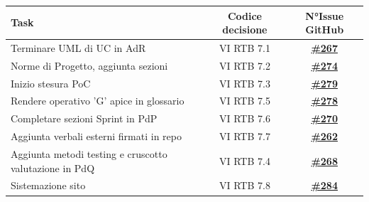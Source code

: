 \documentclass[a4paper,12pt]{article}
\newcommand{\ignoreglossary}{}
\begin{document}
\begin{center}
\small
\renewcommand{\arraystretch}{1.2} 
\begin{tabular}{|p{}|c|c|}
\hline
\rowcolor{gray!60} 
\textbf{Task} & \textbf{Codice decisione} & \textbf{N°Issue GitHub} \\
\hline
\rowcolor{white}
Terminare UML di UC in AdR & VI \ignoreglossary{RTB} 7.1 & \href{https://github.com/SWE-BitByBit/SWE-docs/issues/267}{\textbf{\#267}} \\
\hline
\rowcolor{gray!20}
Norme di Progetto, aggiunta sezioni & VI \ignoreglossary{RTB} 7.2 & \href{https://github.com/SWE-BitByBit/SWE-docs/issues/274}{\textbf{\#274}} \\
\hline
\rowcolor{white}
Inizio stesura PoC & VI \ignoreglossary{RTB} 7.3 & \href{https://github.com/SWE-BitByBit/SWE-docs/issues/279}{\textbf{\#279}} \\
\hline
\rowcolor{gray!20}
Rendere operativo 'G' apice in glossario & VI \ignoreglossary{RTB} 7.5 & \href{https://github.com/SWE-BitByBit/SWE-docs/issues/278}{\textbf{\#278}} \\
\hline
\rowcolor{white}
Completare sezioni Sprint in PdP & VI \ignoreglossary{RTB} 7.6 & \href{https://github.com/SWE-BitByBit/SWE-docs/issues/270}{\textbf{\#270}} \\
\hline
\rowcolor{gray!20}
Aggiunta verbali esterni firmati in repo & VI \ignoreglossary{RTB} 7.7 & \href{https://github.com/SWE-BitByBit/SWE-docs/issues/262}{\textbf{\#262}} \\
\hline
\rowcolor{white}
Aggiunta metodi testing e cruscotto valutazione in PdQ & VI \ignoreglossary{RTB} 7.4 & \href{https://github.com/SWE-BitByBit/SWE-docs/issues/278}{\textbf{\#268}} \\
\hline
\rowcolor{gray!20}
Sistemazione sito & VI \ignoreglossary{RTB} 7.8 & \href{https://github.com/SWE-BitByBit/SWE-docs/issues/284}{\textbf{\#284}} \\
\hline
\end{tabular}
\end{center}
\end{document}
